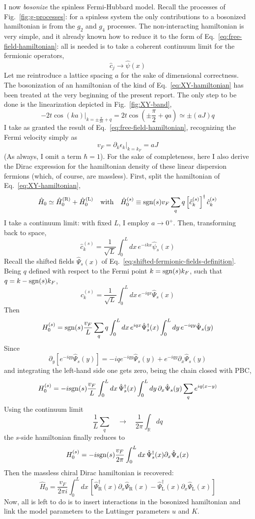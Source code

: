 I now \textit{bosonize} the spinless Fermi-Hubbard model. Recall the processes of Fig.~\ref{fig:g-processes}: for a spinless system the only contributions to a bosonized hamiltonian is from the $g_2$ and $g_4$ processes. The non-interacting hamiltonian is very simple, and it already known how to reduce it to the form of Eq.~\eqref{eq:free-field-hamiltonian}: all is needed is to take a coherent continuum limit for the fermionic operators,
\[
	\hat c_j \to \hat \psi(x)
\]
Let me reintroduce a lattice spacing $a$ for the sake of dimensional correctness. The bosonization of an hamiltonian of the kind of Eq.~\eqref{eq:XY-hamiltonian} has been treated at the very beginning of the present report. The only step to be done is the linearization depicted in Fig.~\ref{fig:XY-band},
\[
	-2t \cos (ka) \big|_{k = \pm \frac{\pi}{2a} + q} = 2t \cos \left(
		\pm \frac{\pi}{2} + qa
	\right) \simeq \pm (a J) q
\]
I take as granted the result of Eq.~\eqref{eq:free-field-hamiltonian}, recognizing the Fermi velocity simply as
\[
	v_F = \partial_k \epsilon_k \big|_{k = k_F} = a J
\]
(As always, I omit a term $\hbar=1$).
For the sake of completeness, here I also derive the Dirac expression for the hamiltonian density of these linear dispersion fermions (which, of course, are massless). First, split the hamiltonian of Eq.~\eqref{eq:XY-hamiltonian},
\[
	\hat H_0 \simeq \hat H_0^{(\mathrm{R})} + \hat H_0^{(\mathrm{L})}
	\quad\text{with}\quad
	\hat H_0^{(s)} \equiv \mathrm{sgn}(s) v_F \sum_q q \left[ \hat c_k^{(s)} \right]^\dagger \hat c_k^{(s)}
\]
I take a continuum limit: with fixed $L$, I employ $a \to 0^+$. Then, transforming back to space,
\[
	\hat c_k^{(s)} = \frac{1}{\sqrt{L}} \int_0^L dx \, e^{-ikx} \hat \psi_s(x) 
\]
Recall the shifted fields $\hat \Psi_s(x)$ of Eq.~\eqref{eq:shifted-fermionic-fields-definition}. Being $q$ defined with respect to the Fermi point $k = \mathrm{sgn}(s) k_F$, such that $q = k - \mathrm{sgn}(s) k_F$,
\[
	\hat c_k^{(s)} = \frac{1}{\sqrt{L}} \int_0^L dx \, e^{-iqx} \hat \Psi_s(x)
\]
Then
\[
	H_0^{(s)} = \mathrm{sgn}(s) \frac{v_F}{L} \sum_q q \int_0^L dx \, e^{iqx} \hat \Psi_s^\dagger(x) \int_0^L dy \, e^{-iqy} \hat \Psi_s(y)
\]
Since
\[
	\partial_y \left[
		e^{-iqy} \hat \Psi_s(y)
	\right] = -iq e^{-iqy} \hat \Psi_s(y) + e^{-iqy} \partial_x \hat \Psi_s(y)
\]
and integrating the left-hand side one gets zero, being the chain closed with PBC,
\[
	H_0^{(s)} = -i\mathrm{sgn}(s) \frac{v_F}{L} \int_0^L dx \, \hat \Psi_s^\dagger(x) \int_0^L dy \, \partial_x \hat \Psi_s(y) \sum_q e^{iq(x-y)}
\]
Using the continuum limit
\[
	\frac{1}{L} \sum_q
	\quad\to\quad
	\frac{1}{2\pi} \int_\mathbb{R} dq 
\]
the $s$-side hamiltonian finally reduces to
\[
	H_0^{(s)} = -i\mathrm{sgn}(s) \frac{v_F}{2\pi} \int_0^L dx \, \hat \Psi_s^\dagger(x) \partial_x \hat \Psi_s(x)
\]
Then the massless chiral Dirac hamiltonian is recovered:
\begin{equation}\label{eq:massless-Dirac-hamiltonian}
	\hat H_0 = \frac{v_F}{2\pi i} \int_0^L dx \, \left[
		\hat \Psi_\mathrm{R}^\dagger(x) \partial_x \hat \Psi_\mathrm{R}(x) - \hat \Psi_\mathrm{L}^\dagger(x) \partial_x \hat \Psi_\mathrm{L}(x)
	\right]
\end{equation}
Now, all is left to do is to insert interactions in the bosonized hamiltonian and link the model parameters to the Luttinger parameters $u$ and $K$.

